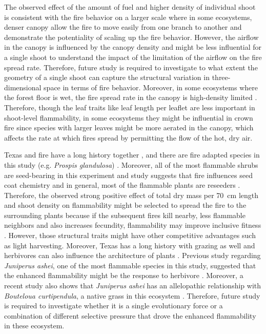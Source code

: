 \documentclass[12pt]{report}
\begin{document}
The observed effect of the amount of fuel and higher density of individual shoot is consistent with the fire behavior on a larger scale where in some ecosystems, denser canopy allow the fire to move easily from one branch to another \citep{bond1996fire} and demonstrate the potentiality of scaling up the fire behavior. However, the airflow in the canopy is influenced by the canopy density  \citep{cionco1978analysis} and might be less influential for a single shoot to understand the impact of the limitation of the airflow on the fire spread rate. Therefore, future study is required to investigate to what extent the geometry of a single shoot can capture the structural variation in three-dimensional space in terms of fire behavior. Moreover, in some ecosystems where the forest floor is wet, the fire spread rate in the canopy is high-density limited  \citep{ray2005micrometeorological}. Therefore, though the leaf traits like leaf length per leaflet are less important in shoot-level flammability, in some ecosystems they might be influential in crown fire since species with larger leaves might be more aerated in the canopy, which affects the rate at which fires spread by permitting the flow of the hot, dry air. 

Texas and fire have a long history together \citep{moir1982firehistory, stambaugh2011firehistory,stambaugh2014historicalfirehistory,smeins2005historyoffire1}, and there are fire adapted species in this study (e.g. \emph{Prospis glandulosa}) \citep{glandulosahoney,wright1976effect}. Moreover, all of the most flammable shrubs are seed-bearing in this experiment and study suggests that fire influences seed coat chemistry \citep{mcinnes2022doesseedcoatchemistry} and in general, most of the flammable plants are reseeders \citep{midgley2011pushingreseeders}. Therefore,  the observed strong positive effect of total dry mass per 70 \,cm length and shoot density on flammability might be selected to spread the fire to the surrounding plants because if the subsequent fires kill nearby, less flammable neighbors and also increases fecundity, flammability may improve inclusive fitness \citep{bond1995kill}. However, those structural traits might have other competitive advantages such as light harvesting. Moreover, Texas has a long history with grazing as well and herbivores can also influence the architecture of plants \citep{danell1994browseeffects}. Previous study regarding \emph{Juniperus ashei}, one of the most flammable species in this study, suggested that the enhanced flammability might be the response to herbivore \citep{owens1998seasonal}. Moreover, a recent study also shows that \emph{Juniperus ashei} has an allelopathic relationship with \emph{Bouteloua curtipendula}, a native grass in this ecosystem \citep{young2009assessmentallelopathy}. Therefore, future study is required to investigate whether it is a single evolutionary force or a combination of different selective pressure that drove the enhanced flammability in these ecosystem.
\end{document}

